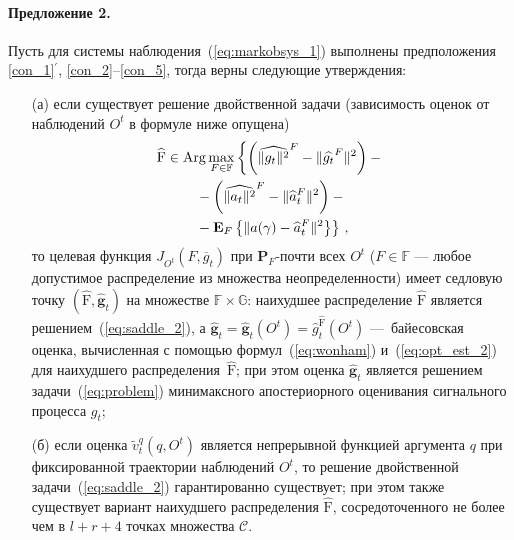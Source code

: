 \begin{multicols}{2}
 \paragraph*{Предложение 2.}Пусть для системы наблюдения~(\ref{eq:markobsys_1})
 выполнены предположения \ref{con_1}$^\prime$, \ref{con_2}--\ref{con_5}, тогда верны 
 следующие утверждения:
 \begin{itemize}
 \item[(а)] если существует решение двойственной задачи (зависимость оценок от наблюдений $O^t$ в формуле ниже опущена)
 \begin{multline}
 \displaystyle \widehat{\mathrm{F}} \in \mathop{\mathrm {Arg}} \max_{F \in \mathbb{F}}
 \left\{\left(\widehat{\|g_t\|^2}^F-\|\widehat{g_t}^F\|^2\right) -{}\right.\\
 {}- \left(\widehat{\|a_t\|^2}^F -\|\widehat{a}_t^F\|^2\right)-{}\\
 \left. {}-  \mathbf{E}_{ F }\left\{ \mathop{\|a(\gamma)-\widehat{a}_t^F\|^2} \right\} \right\}\,,
 \label{eq:saddle_2}
\end{multline}
 то целевая функция $J_{O^t}(F,\overline{g}_t)$ при
 $\mathbf{P}_F$-почти всех $O^t$ ($F \in \mathbb{F}$ --- любое допустимое распределение
 из множества неопределенности) имеет седловую точку
 $(\widehat{\mathrm{F}},\widehat{\mathbf{g}}_t)$ на множестве $\mathbb{F} \times
 \mathbb{G}$: наихудшее распределение $\widehat{\mathrm{F}}$
 является решением~(\ref{eq:saddle_2}), а
 $ \widehat{\mathbf{g}}_t=\widehat{\mathbf{g}}_t(O^t)
 = \widehat{g}^{\widehat{\mathrm{F}}}_t(O^t)
 $
---~байесовская оценка, вычисленная с помощью формул~(\ref{eq:wonham})
 и~(\ref{eq:opt_est_2}) для наихудшего распределения~$\widehat{\mathrm{F}}$;
 при этом оценка $\widehat{\mathbf{g}}_t$ является решением
 задачи~(\ref{eq:problem}) минимаксного апостериорного оценивания сигнального
 процесса $g_t$;
 \item[(б)]
 если оценка $\widetilde{v}_t^q(q,O^t)$ является непрерывной функцией аргумента
 $q$ при фиксированной
 траектории наблюдений $O^t$, то решение двойственной задачи~(\ref{eq:saddle_2})
 гарантированно существует; при этом также существует вариант наихудшего распределения
 $\widehat{\mathrm{F}}$, сосредоточенного не более чем в $l+r+4$ точках
 множества $\mathcal{C}$.
 \end{itemize}



\end{multicols}
